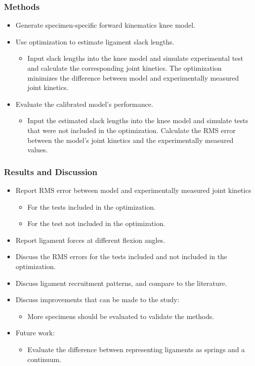 \documentclass{article}
\begin{document}
\subsubsection{Methods}
\begin{itemize}
    \item Generate specimen-specific forward kinematics knee model.
    \item Use optimization to estimate ligament slack lengths.
    \begin{itemize}
        \item Input slack lengths into the knee model and simulate experimental test and calculate the corresponding joint kinetics. The optimization minimizes the difference between model and experimentally measured joint kinetics.
    \end{itemize}
    \item Evaluate the calibrated model's performance.
    \begin{itemize}
        \item Input the estimated slack lengths into the knee model and simulate tests that were not included in the optimization. Calculate the RMS error between the model's joint kinetics and the experimentally measured values.
    \end{itemize}
\end{itemize}
\subsubsection{Results and Discussion}
\begin{itemize}
    \item Report RMS error between model and experimentally measured joint kinetics
    \begin{itemize}
        \item For the tests included in the optimization.
        \item For the test not included in the optimization.
    \end{itemize}
    \item Report ligament forces at different flexion angles.
    \item Discuss the RMS errors for the tests included and not included in the optimization.
    \item Discuss ligament recruitment patterns, and compare to the literature.
    \item Discuss improvements that can be made to the study:
    \begin{itemize}
        \item More specimens should be evaluated to validate the methods.
    \end{itemize}
    \item Future work:
    \begin{itemize}
        \item Evaluate the difference between representing ligaments as springs and a continuum.
    \end{itemize}
\end{itemize}
\end{document}
